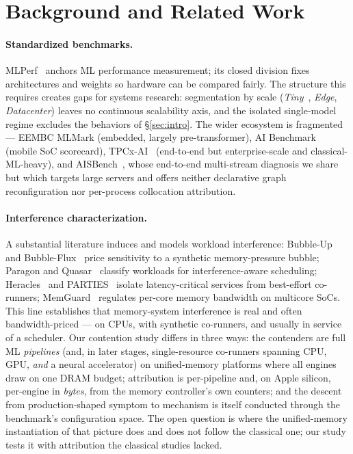 \section{Background and Related Work}
\label{sec:background}

\paragraph{Standardized benchmarks.} MLPerf~\cite{reddi2020mlperf} anchors
ML performance measurement; its closed division fixes architectures and
weights so hardware can be compared fairly. The structure this requires
creates gaps for systems research: segmentation by scale
(\emph{Tiny}~\cite{banbury2021mlperftiny}, \emph{Edge}, \emph{Datacenter})
leaves no continuous scalability axis, and the isolated single-model regime
excludes the behaviors of \S\ref{sec:intro}. The wider ecosystem is
fragmented --- EEMBC MLMark (embedded, largely pre-transformer), AI
Benchmark~\cite{ignatov2019aibenchmark} (mobile SoC scorecard),
TPCx-AI~\cite{brucke2023tpcxai} (end-to-end but enterprise-scale and
classical-ML-heavy), and AISBench~\cite{aisbench}, whose end-to-end
multi-stream diagnosis we share but which targets large servers and offers
neither declarative graph reconfiguration nor per-process collocation
attribution.

\paragraph{Interference characterization.} A substantial literature induces
and models workload interference: Bubble-Up~\cite{mars2011bubbleup} and
Bubble-Flux~\cite{yang2013bubbleflux} price sensitivity to a synthetic
memory-pressure bubble; Paragon and Quasar~\cite{delimitrou2013paragon,
delimitrou2014quasar} classify workloads for interference-aware scheduling;
Heracles~\cite{lo2015heracles} and PARTIES~\cite{chen2019parties} isolate
latency-critical services from best-effort co-runners;
MemGuard~\cite{yun2013memguard} regulates per-core memory bandwidth on
multicore SoCs. This line establishes that memory-system interference is
real and often bandwidth-priced --- on CPUs, with synthetic co-runners, and
usually in service of a scheduler. Our contention study differs in three
ways: the contenders are full ML \emph{pipelines} (and, in later stages,
single-resource co-runners spanning CPU, GPU, \emph{and} a neural
accelerator) on unified-memory platforms where all engines draw on one DRAM
budget; attribution is per-pipeline and, on Apple silicon, per-engine in
\emph{bytes}, from the memory controller's own counters; and the descent
from production-shaped symptom to mechanism is itself conducted through the
benchmark's configuration space. The open question is where the unified-memory instantiation of that
picture does and does not follow the classical one; our study tests it
with attribution the classical studies lacked.

